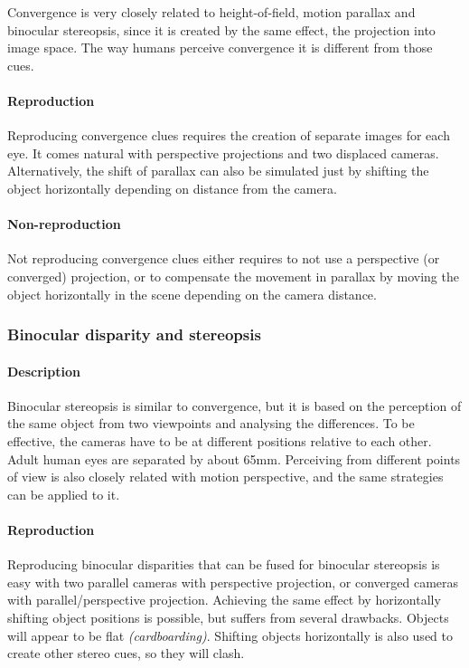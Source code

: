 Convergence is very closely related to height-of-field, motion parallax and binocular stereopsis, since it is created by the same effect, the projection into image space.
The way humans perceive convergence it is different from those cues.

\paragraph{Reproduction}
Reproducing convergence clues requires the creation of separate images for each eye.
It comes natural with perspective projections and two displaced cameras.
Alternatively, the shift of parallax can also be simulated just by shifting the object horizontally depending on distance from the camera.

\paragraph{Non-reproduction}
Not reproducing convergence clues either requires to not use a perspective (or converged) projection, or to compensate the movement in parallax by moving the object horizontally in the scene depending on the camera distance.


\subsubsection{Binocular disparity and stereopsis}
\paragraph{Description}
Binocular stereopsis is similar to convergence, but it is based on the perception of the same object from two viewpoints and analysing the differences.
To be effective, the cameras have to be at different positions relative to each other.
Adult human eyes are separated by about 65mm. Perceiving from different points of view is also closely related with motion perspective, and the same strategies can be applied to it.

\paragraph{Reproduction}
Reproducing binocular disparities that can be fused for binocular stereopsis is easy with two parallel cameras with perspective projection, or converged cameras with parallel/perspective projection.
Achieving the same effect by horizontally shifting object positions is possible, but suffers from several drawbacks. Objects will appear to be flat \textit{(cardboarding)}. Shifting objects horizontally is also used to create other stereo cues, so they will clash.


